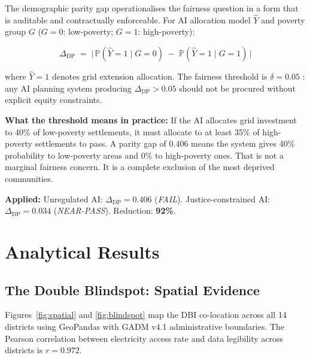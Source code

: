 \documentclass[preprint,12pt]{elsarticle}
\begin{document}
\begin{tcolorbox}[metDP,
  title={Metric 3: Demographic Parity Gap ($\Delta_{\mathrm{DP}}$)
         --- Is the AI planning model fair?}]

The demographic parity gap operationalises the fairness
question in a form that is auditable and contractually
enforceable. For AI allocation model $\hat{Y}$ and poverty
group $G$ ($G=0$: low-poverty; $G=1$: high-poverty):

\begin{equation}
\Delta_{\mathrm{DP}} \;=\;
\bigl|\,\mathbb{P}(\hat{Y}=1 \mid G=0)
\;-\;
\mathbb{P}(\hat{Y}=1 \mid G=1)\,\bigr|
\label{eq:dp}
\end{equation}

\noindent where $\hat{Y}=1$ denotes grid extension allocation.
The fairness threshold is $\delta = 0.05$ \cite{Barocas2019}:
any AI planning system producing $\Delta_{\mathrm{DP}} > 0.05$
should not be procured without explicit equity constraints.

\medskip
\textbf{What the threshold means in practice:} If the AI
allocates grid investment to 40\% of low-poverty settlements,
it must allocate to at least 35\% of high-poverty settlements
to pass. A parity gap of 0.406 means the system gives 40\%
probability to low-poverty areas and 0\% to high-poverty
ones. That is not a marginal fairness concern. It is a
complete exclusion of the most deprived communities.

\medskip
\textbf{Applied:} Unregulated AI: $\Delta_{\mathrm{DP}} = 0.406$
(\textit{FAIL}). Justice-constrained AI:
$\Delta_{\mathrm{DP}} = 0.034$ (\textit{NEAR-PASS}).
Reduction: \textbf{92\%}.

\end{tcolorbox}

\section{Analytical Results}
\label{sec:results}

\subsection{The Double Blindspot: Spatial Evidence}

Figures~\ref{fig:spatial} and \ref{fig:blindspot} map the
DBI co-location across all 14 districts using GeoPandas
with GADM v4.1 administrative boundaries. The Pearson
correlation between electricity access rate and data
legibility across districts is $r = 0.972$.
\end{document}
